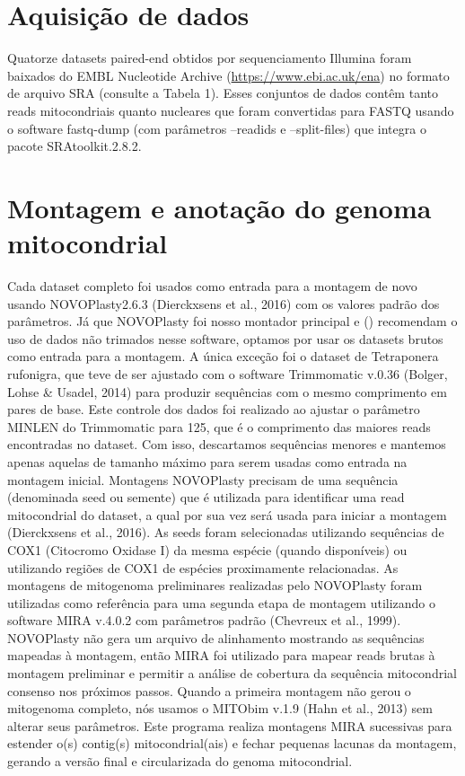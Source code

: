 \documentclass[../DISSERTACAO_MAIN.tex]{subfiles}
\begin{document}
\section{Aquisição de dados}

	Quatorze datasets paired-end obtidos por sequenciamento Illumina foram baixados do EMBL Nucleotide Archive (\url{https://www.ebi.ac.uk/ena}) no formato de arquivo SRA (consulte a Tabela 1). Esses conjuntos de dados contêm tanto reads mitocondriais quanto nucleares que foram convertidas para FASTQ usando o software fastq-dump (com parâmetros –readids e –split-files) que integra o pacote SRAtoolkit.2.8.2. 

\section{Montagem e anotação do genoma mitocondrial}
	
	Cada dataset completo foi usados como entrada para a montagem de novo usando NOVOPlasty2.6.3 (Dierckxsens et al., 2016) com os valores padrão dos parâmetros. Já que NOVOPlasty foi nosso montador principal e  (\citeyear{Dierckxsens2016}) recomendam o uso de dados não trimados nesse software, optamos por usar os datasets brutos como entrada para a montagem. A única exceção foi o dataset de Tetraponera rufonigra, que teve de ser ajustado com o software Trimmomatic v.0.36 (Bolger, Lohse \& Usadel, 2014) para produzir sequências com o mesmo comprimento em pares de base. Este controle dos dados foi realizado ao ajustar o parâmetro MINLEN do Trimmomatic para 125, que é o comprimento das maiores reads encontradas no dataset. Com isso, descartamos sequências menores e mantemos apenas aquelas de tamanho máximo para serem usadas como entrada na montagem inicial. Montagens NOVOPlasty precisam de uma sequência (denominada seed ou semente) que é utilizada para identificar uma read mitocondrial do dataset, a qual por sua vez será usada para iniciar a montagem (Dierckxsens et al., 2016). As seeds foram selecionadas utilizando sequências de COX1 (Citocromo Oxidase I) da mesma espécie (quando disponíveis) ou utilizando regiões de COX1 de espécies proximamente relacionadas. As montagens de mitogenoma preliminares realizadas pelo NOVOPlasty foram utilizadas como referência para uma segunda etapa de montagem utilizando o software MIRA v.4.0.2 com parâmetros padrão (Chevreux et al., 1999). NOVOPlasty não gera um arquivo de alinhamento mostrando as sequências mapeadas à montagem, então MIRA foi utilizado para mapear reads brutas  à montagem preliminar e permitir a análise de cobertura da sequência mitocondrial consenso nos próximos passos. Quando a primeira montagem não gerou o mitogenoma completo, nós usamos o MITObim v.1.9 (Hahn et al., 2013) sem alterar seus parâmetros. Este programa realiza montagens MIRA sucessivas para estender o(s) contig(s) mitocondrial(ais) e fechar pequenas lacunas da montagem, gerando a versão final e circularizada do genoma mitocondrial.	
	
\end{document}
